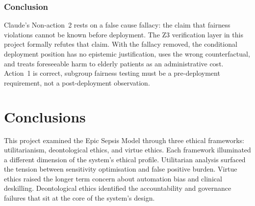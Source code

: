 \documentclass[]{UCD_CS_41820_Report}
\begin{document}
\subsection*{Conclusion}

Claude's Non-action~2 rests on a false cause fallacy: the claim that fairness
violations cannot be known before deployment. The Z3 verification layer in this
project formally refutes that claim. With the fallacy removed, the conditional
deployment position has no epistemic justification, uses the wrong counterfactual,
and treats foreseeable harm to elderly patients as an administrative cost. Action~1
is correct, subgroup fairness testing must be a pre-deployment requirement, not
a post-deployment observation.

\chapter{Conclusions}

This project examined the Epic Sepsis Model through three ethical frameworks:
utilitarianism, deontological ethics, and virtue ethics. Each framework illuminated
a different dimension of the system's ethical profile. Utilitarian analysis surfaced
the tension between sensitivity optimisation and false positive burden. Virtue ethics
raised the longer term concern about automation bias and clinical deskilling.
Deontological ethics identified the accountability and governance failures that sit
at the core of the system's design.

\medskip
\end{document}
